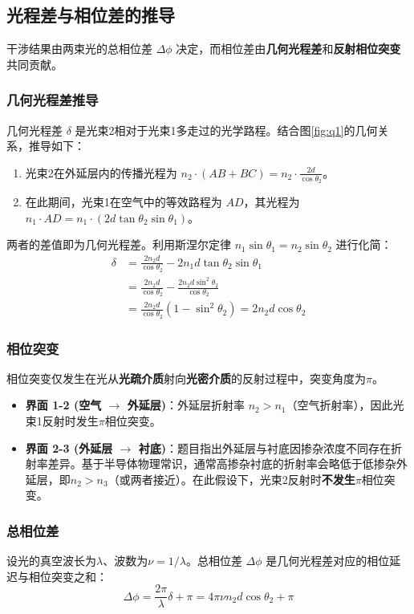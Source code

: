\documentclass[withoutpreface,bwprint]{cumcmthesis} %
\begin{document}
\subsection{光程差与相位差的推导}

干涉结果由两束光的总相位差 $\Delta\phi$ 决定，而相位差由\textbf{几何光程差}和\textbf{反射相位突变}共同贡献。

\subsubsection{几何光程差推导}
几何光程差 $\delta$ 是光束2相对于光束1多走过的光学路程。结合图\ref{fig:q1}的几何关系，推导如下：
\begin{enumerate}
    \item 光束2在外延层内的传播光程为 $n_2 \cdot (AB+BC) = n_2 \cdot \displaystyle\frac{2d}{\cos\theta_2}$。
    \item 在此期间，光束1在空气中的等效路程为 $AD$，其光程为 $n_1 \cdot AD = n_1 \cdot (2d \tan\theta_2 \sin\theta_1)$。
\end{enumerate}
两者的差值即为几何光程差。利用斯涅尔定律 $n_1 \sin\theta_1 = n_2 \sin\theta_2$ 进行化简：
\begin{align}
\delta &= \frac{2n_2 d}{\cos\theta_2} - 2n_1 d \tan\theta_2 \sin\theta_1 \nonumber \\
&= \frac{2n_2 d}{\cos\theta_2} - \frac{2n_2 d \sin^2\theta_2}{\cos\theta_2} \nonumber \\
&= \frac{2n_2 d}{\cos\theta_2} (1 - \sin^2\theta_2) = 2n_2 d \cos\theta_2
\end{align}

\subsubsection{相位突变}
相位突变仅发生在光从\textbf{光疏介质}射向\textbf{光密介质}的反射过程中，突变角度为$\pi$。
\begin{itemize}
    \item \textbf{界面 1-2 (空气 $\to$ 外延层)}：外延层折射率 $n_2 > n_1$（空气折射率），因此光束1反射时发生$\pi$相位突变。
    \item \textbf{界面 2-3 (外延层 $\to$ 衬底)}：题目指出外延层与衬底因掺杂浓度不同存在折射率差异。基于半导体物理常识，通常高掺杂衬底的折射率会略低于低掺杂外延层，即$n_2 > n_3$（或两者接近）。在此假设下，光束2反射时\textbf{不发生}$\pi$相位突变。
\end{itemize}

\subsubsection{总相位差}
设光的真空波长为$\lambda$、波数为$\nu=1/\lambda$。总相位差 $\Delta\phi$ 是几何光程差对应的相位延迟与相位突变之和：
\begin{equation}
\Delta\phi = \frac{2\pi}{\lambda}\delta + \pi = 4\pi\nu n_2 d \cos\theta_2 + \pi
\end{equation}
\end{document}
